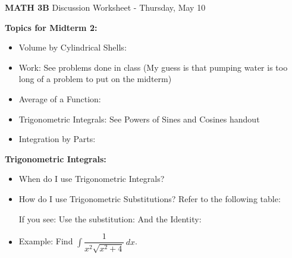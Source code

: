 \documentclass[12pt]{report}
\newcommand{\ds}{\displaystyle}
\begin{document}
\begin{center}
\textbf{{\LARGE MATH 3B}  \hfill} Discussion Worksheet - Thursday, May 10\\

\end{center}



\noindent\textbf{Topics for Midterm 2:}

\begin{itemize}

\item Volume by Cylindrical Shells: %

\item Work: See problems done in class (My guess is that pumping water is too long of a problem to put on the midterm)


\item Average of a Function: %

\item Trigonometric Integrals: See Powers of Sines and Cosines handout

\item Integration by Parts: %

\end{itemize} 

\noindent\textbf{Trigonometric Integrals:}

\begin{itemize}

\item When do I use Trigonometric Integrals? %

\item How do I use Trigonometric Substitutions? Refer to the following table:

If you see: \hspace{1.15in} Use the substitution: \hspace{1.15in} And the Identity:

\vspace{2.25in}

\item Example: Find $\ds \int \dfrac{1}{x^2\sqrt{x^2 + 4}} \, dx$.

\end{itemize}
\end{document}
